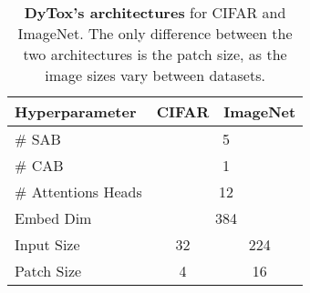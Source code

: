 \begin{table}[t]
    \centering
    \begin{tabular}{@{}l|cc@{}}
        \hline
        Hyperparameter      & CIFAR                   & ImageNet \Tstrut\Bstrut \\
        \hline
        \# SAB              & \multicolumn{2}{c}{5}                             \\
        \# CAB              & \multicolumn{2}{c}{1}                             \\
        \# Attentions Heads & \multicolumn{2}{c}{12}                            \\
        Embed Dim           & \multicolumn{2}{c}{384}                           \\
        Input Size          & 32                      & 224                     \\
        Patch Size          & 4                       & 16                      \\
        \hline
    \end{tabular}
    \caption{\textbf{DyTox's architectures} for CIFAR and ImageNet. The only difference between the
        two architectures is the patch size, as the image sizes vary between datasets.}
    \label{tab:dytox_archi}
\end{table}
